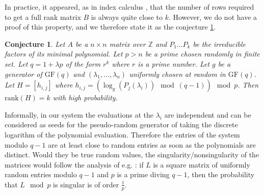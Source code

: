 \documentclass{article}
\newtheorem{conj}[thm]{Conjecture}
\begin{document}
In practice, it appeared, as in index calculus
\cite{Bender:1998:rdlog,Hess:2007:dlog}, that the
number of rows
required to get a
full rank matrix $B$ is always quite close to $k$.
However, we do not have a proof of this property, and we therefore 
state it as the conjecture
\ref{conj:dlog}. 
\begin{conj}\label{conj:dlog}
Let $A$ be a $n\times n$ matrix over $\mathbb{Z}$ and $P_1\dots P_k$ be the
irreducible factors of its minimal polynomial.
Let $p>n$ be a prime chosen randomly in finite set. Let $q=1+\lambda p$ of the
form $r^k$ where $r$ is a prime number. Let $g$ be a generator of $\text{GF}(q)$
  and $(\lambda_1,\dots,\lambda_n)$  uniformly chosen at random in
  $\text{GF}(q)$.
Let $H=[h_{i,j}]$ where $h_{i,j}=(\log_g(P_j(\lambda_i)) \mod (q-1))\mod p$. 
Then $\text{rank}(H)=k$ with high probability.


\end{conj}



Informally, in our system the
evaluations at the $\lambda_i$ are independent and can be
considered as seeds for the pseudo-random generator of taking the
discrete logarithm of the polynomial evaluation. 
Therefore the entries of the system modulo $q-1$ 
are at least close to random entries as soon as the polynomials are
distinct.
Would they be true random values,  the singularity/nonsingularity of the matrices
would follow the analysis of e.g. \cite[Corollary
2.4]{Blomer:1997:rank}: 
if $L$ is a square matrix of uniformly random 
entries modulo $q-1$ and $p$ is a prime  diving $q-1$, then the
probability that $L \mod p$ is singular is of order $\frac{1}{p}$.
\end{document}
